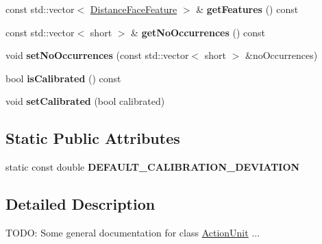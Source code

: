\begin{DoxyCompactItemize}
\item 
const std\+::vector$<$ \hyperlink{classinsight_1_1DistanceFaceFeature}{Distance\+Face\+Feature} $>$ \& {\bfseries get\+Features} () const \hypertarget{classinsight_1_1ActionUnit_a2297884ce2226d97d53daf02fba18621}{}\label{classinsight_1_1ActionUnit_a2297884ce2226d97d53daf02fba18621}

\item 
const std\+::vector$<$ short $>$ \& {\bfseries get\+No\+Occurrences} () const \hypertarget{classinsight_1_1ActionUnit_a7e5a48c4aca2b112fc09ecab45b9df1f}{}\label{classinsight_1_1ActionUnit_a7e5a48c4aca2b112fc09ecab45b9df1f}

\item 
void {\bfseries set\+No\+Occurrences} (const std\+::vector$<$ short $>$ \&no\+Occurrences)\hypertarget{classinsight_1_1ActionUnit_a0e003c3c1cef8900794ede3533255e12}{}\label{classinsight_1_1ActionUnit_a0e003c3c1cef8900794ede3533255e12}

\item 
bool {\bfseries is\+Calibrated} () const \hypertarget{classinsight_1_1ActionUnit_a2a191b14620036f8d79e45080becdfff}{}\label{classinsight_1_1ActionUnit_a2a191b14620036f8d79e45080becdfff}

\item 
void {\bfseries set\+Calibrated} (bool calibrated)\hypertarget{classinsight_1_1ActionUnit_accdc908e23fb5a4e74ba9dcb5180aa03}{}\label{classinsight_1_1ActionUnit_accdc908e23fb5a4e74ba9dcb5180aa03}

\end{DoxyCompactItemize}
\subsection*{Static Public Attributes}
\begin{DoxyCompactItemize}
\item 
static const double {\bfseries D\+E\+F\+A\+U\+L\+T\+\_\+\+C\+A\+L\+I\+B\+R\+A\+T\+I\+O\+N\+\_\+\+D\+E\+V\+I\+A\+T\+I\+ON}\hypertarget{classinsight_1_1ActionUnit_a0a9e999447b613332e69d66158011931}{}\label{classinsight_1_1ActionUnit_a0a9e999447b613332e69d66158011931}

\end{DoxyCompactItemize}


\subsection{Detailed Description}
T\+O\+DO\+: Some general documentation for class \hyperlink{classinsight_1_1ActionUnit}{Action\+Unit} ... 